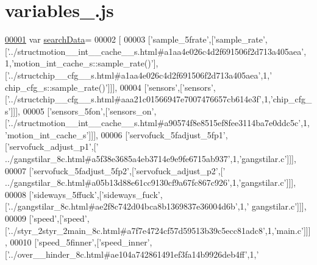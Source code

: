 \hypertarget{variables__12_8js_source}{}\section{variables\+\_.\+js}
\label{variables__12_8js_source}

\begin{DoxyCode}
\hypertarget{variables__12_8js_source.tex_l00001}{}\hyperlink{variables__12_8js_ad01a7523f103d6242ef9b0451861231e}{00001} var \hyperlink{variables__12_8js_ad01a7523f103d6242ef9b0451861231e}{searchData}=
00002 [
00003   [\textcolor{stringliteral}{'sample\_5frate'},[\textcolor{stringliteral}{'sample\_rate'},[\textcolor{stringliteral}{'../structmotion\_\_int\_\_cache\_\_s.html#a1aa4e026c4d2f691506f2d713a405aea'},
      1,\textcolor{stringliteral}{'motion\_int\_cache\_s::sample\_rate()'}],[\textcolor{stringliteral}{'../structchip\_\_cfg\_\_s.html#a1aa4e026c4d2f691506f2d713a405aea'},1,\textcolor{stringliteral}{'
      chip\_cfg\_s::sample\_rate()'}]]],
00004   [\textcolor{stringliteral}{'sensors'},[\textcolor{stringliteral}{'sensors'},[\textcolor{stringliteral}{'../structchip\_\_cfg\_\_s.html#aaa21c01566947e7007476657cb614e3f'},1,\textcolor{stringliteral}{'chip\_cfg\_s'}]]],
00005   [\textcolor{stringliteral}{'sensors\_5fon'},[\textcolor{stringliteral}{'sensors\_on'},[\textcolor{stringliteral}{'../structmotion\_\_int\_\_cache\_\_s.html#a90574f8e8515ef8fee3114ba7e0ddc5c'},1,\textcolor{stringliteral}{
      'motion\_int\_cache\_s'}]]],
00006   [\textcolor{stringliteral}{'servofuck\_5fadjust\_5fp1'},[\textcolor{stringliteral}{'servofuck\_adjust\_p1'},[\textcolor{stringliteral}{'
      ../gangstilar\_8c.html#a5f38e3685a4eb3714e9e9fe6715ab937'},1,\textcolor{stringliteral}{'gangstilar.c'}]]],
00007   [\textcolor{stringliteral}{'servofuck\_5fadjust\_5fp2'},[\textcolor{stringliteral}{'servofuck\_adjust\_p2'},[\textcolor{stringliteral}{'
      ../gangstilar\_8c.html#a05b13d88e61cc9130cf9a67fc867c926'},1,\textcolor{stringliteral}{'gangstilar.c'}]]],
00008   [\textcolor{stringliteral}{'sideways\_5ffuck'},[\textcolor{stringliteral}{'sideways\_fuck'},[\textcolor{stringliteral}{'../gangstilar\_8c.html#ae2f8c742d04bca8b1369837e36004d6b'},1,\textcolor{stringliteral}{'
      gangstilar.c'}]]],
00009   [\textcolor{stringliteral}{'speed'},[\textcolor{stringliteral}{'speed'},[\textcolor{stringliteral}{'../styr\_2styr\_2main\_8c.html#a7f7e4724cf57d59513b39c5ecc81adc8'},1,\textcolor{stringliteral}{'main.c'}]]],
00010   [\textcolor{stringliteral}{'speed\_5finner'},[\textcolor{stringliteral}{'speed\_inner'},[\textcolor{stringliteral}{'../over\_\_hinder\_8c.html#ae104a742861491ef3fa14b9926deb4ff'},1,\textcolor{stringliteral}{'
}
\end{DoxyCode}
